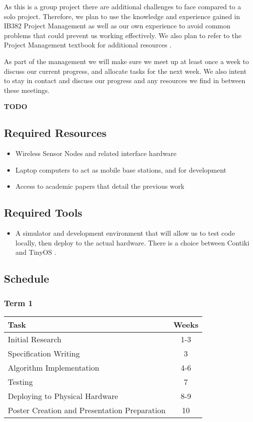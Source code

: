 \documentclass[a4paper]{article}
\begin{document}
As this is a group project there are additional challenges to face compared to a solo project. Therefore, we plan to use the knowledge and experience gained in IB382 Project Management \cite{?} as well as our own experience to avoid common problems that could prevent us working effectively. We also plan to refer to the Project Management textbook for additional resources \cite{PMTextBook}.

As part of the management we will make sure we meet up at least once a week to discuss our current progress, and allocate tasks for the next week. We also intent to stay in contact and discuss our progress and any resources we find in between these meetings.

\textbf{TODO}

\subsection{Required Resources}
\begin{itemize}
	\item Wireless Sensor Nodes and related interface hardware
	\item Laptop computers to act as mobile base stations, and for development
	\item Access to academic papers that detail the previous work 
\end{itemize}

\subsection{Required Tools}
\begin{itemize}
	\item A simulator and development environment that will allow us to test code locally, then deploy to the actual hardware. There is a choice between Contiki \cite{23839452} and TinyOS \cite{levis2003tossim}.
\end{itemize}

\subsection{Schedule}

\subsubsection{Term 1}

\begin{table}[H]
	\centering
	\begin{tabular}{| l | c |}
	\hline
	\textbf{Task} & \textbf{Weeks}\\
	\hline
	Initial Research & 1-3\\
	\hline
	Specification Writing & 3\\
	\hline
	Algorithm Implementation & 4-6\\
	\hline
	Testing & 7\\
	\hline
	Deploying to Physical Hardware & 8-9\\
	\hline
	Poster Creation and Presentation Preparation & 10\\
	\hline
	\end{tabular}
\end{table}
\end{document}
